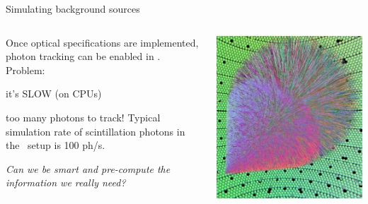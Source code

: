 \documentclass[10pt,aspectratio=169]{beamer}
\begin{document}
\begin{frame}{Simulating background sources}
  \begin{columns}
    \begin{column}{0.6\textwidth}\setlength{\parskip}{10pt}%
    Once optical specifications are implemented, photon tracking can be enabled
    in \geant. Problem:
    \begin{center}
      \alert{it's SLOW} {\small(on CPUs)}
    \end{center}
    too many photons to track! Typical simulation rate of scintillation photons
    in the \gerda\ setup is \alert{100 ph/s}.

    \emph{Can we be smart and pre-compute the information we really need?}
    \end{column}
    \begin{column}{0.4\textwidth}
      \begin{center}
        \includegraphics[width=\columnwidth]{opticks-shower.png}
      \end{center}
    \end{column}
  \end{columns}
\end{frame}
\end{document}
